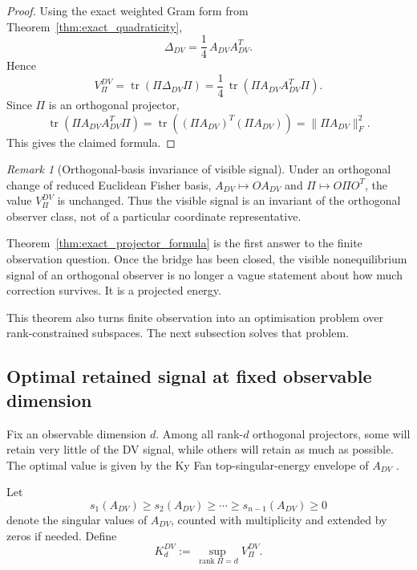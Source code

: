 \documentclass[11pt,a4paper]{article}
\numberwithin{equation}{section}
\theoremstyle{thmcompact}
\theoremstyle{remark}
\newtheorem*{remarkplain}{Remark}
\newenvironment{remark}[1][]%
{\begin{remarkbox}\begin{remarkplain}[#1]\normalfont}
		{\end{remarkplain}\end{remarkbox}}
\begin{document}
\begin{proof}
Using the exact weighted Gram form from Theorem~\ref{thm:exact_quadraticity},
\begin{equation}
\Delta_{DV}=\frac14\,A_{DV}A_{DV}^{T}.
\end{equation}
Hence
\begin{equation}
V_\Pi^{DV}
=
\operatorname{tr}\!\left(\Pi\Delta_{DV}\Pi\right)
=
\frac14\,\operatorname{tr}\!\left(\Pi A_{DV}A_{DV}^{T}\Pi\right).
\end{equation}
Since \(\Pi\) is an orthogonal projector,
\begin{equation}
\operatorname{tr}\!\left(\Pi A_{DV}A_{DV}^{T}\Pi\right)
=
\operatorname{tr}\!\left((\Pi A_{DV})^{T}(\Pi A_{DV})\right)
=
\|\Pi A_{DV}\|_F^2.
\end{equation}
This gives the claimed formula.
\end{proof}

\begin{remark}[Orthogonal-basis invariance of visible signal]
Under an orthogonal change of reduced Euclidean Fisher basis, \(A_{DV}\mapsto O A_{DV}\) and \(\Pi\mapsto O\Pi O^T\), the value \(V_\Pi^{DV}\) is unchanged. Thus the visible signal is an invariant of the orthogonal observer class, not of a particular coordinate representative.
\end{remark}

Theorem~\ref{thm:exact_projector_formula} is the first answer to the finite observation question. Once the bridge has been closed, the visible nonequilibrium signal of an orthogonal observer is no longer a vague statement about how much correction survives. It is a projected energy.

This theorem also turns finite observation into an optimisation problem over rank-constrained subspaces. The next subsection solves that problem.

\subsection{Optimal retained signal at fixed observable dimension}

Fix an observable dimension \(d\). Among all rank-\(d\) orthogonal projectors, some will retain very little of the DV signal, while others will retain as much as possible. The optimal value is given by the Ky Fan top-singular-energy envelope of \(A_{DV}\) \cite{Fan1951,Bhatia1997}.

Let
\begin{equation}
s_1(A_{DV})\ge s_2(A_{DV})\ge \cdots \ge s_{n-1}(A_{DV})\ge 0
\end{equation}
denote the singular values of \(A_{DV}\), counted with multiplicity and extended by zeros if needed. Define
\begin{equation}
K_d^{DV}
:=
\sup_{\operatorname{rank}\Pi=d}V_\Pi^{DV}.
\end{equation}
\end{document}
